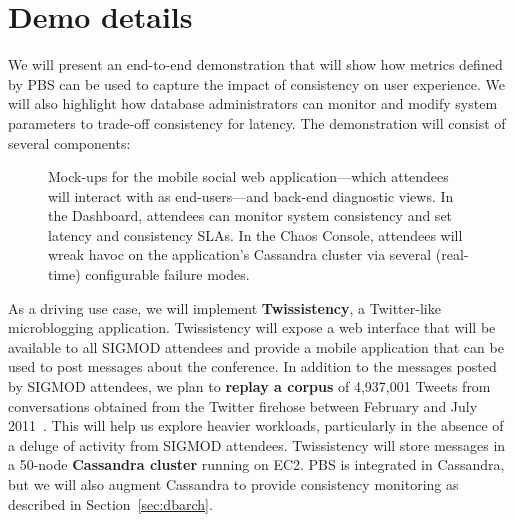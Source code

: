 \section{Demo details}
\label{sec:demo}


We will present an end-to-end demonstration that will show how metrics
defined by PBS can be used to capture the impact of consistency on
user experience. We will also highlight how database administrators
can monitor and modify system parameters to trade-off consistency for
latency. The demonstration will consist of several components:

\begin{figure*}[tb]
\centering
\caption{Mock-ups for the mobile social web application---which
  attendees will interact with as end-users---and back-end diagnostic
  views. In the Dashboard, attendees can monitor system consistency
  and set latency and consistency SLAs. In the Chaos Console,
  attendees will wreak havoc on the application's Cassandra cluster
  via several (real-time) configurable failure modes.}
\label{fig:pbs-demo-screenshot}
\end{figure*}






As a driving use case, we will implement \textbf{Twissistency}, a
Twitter-like microblogging application. Twissistency will expose a web
interface that will be available to all SIGMOD attendees and provide a
mobile application that can be used to post messages about the
conference. In addition to the messages posted by SIGMOD attendees, we
plan to \textbf{replay a corpus} of 4,937,001 Tweets from
conversations obtained from the Twitter firehose between February and
July 2011~\cite{ritter2010unsupervised}. This will help us explore
heavier workloads, particularly in the absence of a deluge of activity
from SIGMOD attendees. Twissistency will store messages in a 50-node
\textbf{Cassandra cluster} running on EC2. PBS is integrated in
Cassandra, but we will also augment Cassandra to provide consistency
monitoring as described in Section~\ref{sec:dbarch}.

